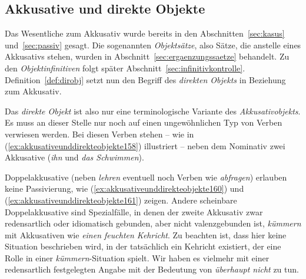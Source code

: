 \subsection{Akkusative und direkte Objekte}
\label{sec:akkusativeunddirekteobjekte}


Das Wesentliche zum Akkusativ wurde bereits in den Abschnitten~\ref{sec:kasus} und~\ref{sec:passiv} gesagt.
Die sogenannten \textit{Objektsätze}, also Sätze, die anstelle eines Akkusativs stehen, wurden in Abschnitt~\ref{sec:ergaenzungssaetze} behandelt.
Zu den \textit{Objektinfinitiven} folgt später Abschnitt~\ref{sec:infinitivkontrolle}.
Definition~\ref{def:dirobj} setzt nun den Begriff des \textit{direkten Objekts} in Beziehung zum Akkusativ.


Das \textit{direkte Objekt} ist also nur eine terminologische Variante des \textit{Akkusativobjekts}.
Es muss an dieser Stelle nur noch auf einen ungewöhnlichen Typ von Verben verwiesen werden.
Bei diesen Verben stehen -- wie in (\ref{ex:akkusativeunddirekteobjekte158}) illustriert -- neben dem Nominativ zwei Akkusative (\textit{ihn} und \textit{das Schwimmen}).

\begin{exe}
  \ex\label{ex:akkusativeunddirekteobjekte158}
  \begin{xlist}
  \end{xlist}
\end{exe}


Doppelakkusative (neben \textit{lehren} eventuell noch Verben wie \textit{abfragen}) erlauben keine Passivierung, wie (\ref{ex:akkusativeunddirekteobjekte160}) und (\ref{ex:akkusativeunddirekteobjekte161}) zeigen.
Andere scheinbare Doppelakkusative sind Spezialfälle, in denen der zweite Akkusativ zwar redensartlich oder idiomatisch gebunden, aber nicht valenzgebunden ist, \zB \textit{kümmern} mit Akkusativen wie \textit{einen feuchten Kehricht}.
Zu beachten ist, dass hier keine Situation beschrieben wird, in der tatsächlich ein Kehricht existiert, der eine Rolle in einer \textit{kümmern}-Situation spielt.
Wir haben es vielmehr mit einer redensartlich festgelegten Angabe mit der Bedeutung von \textit{überhaupt nicht} zu tun.

